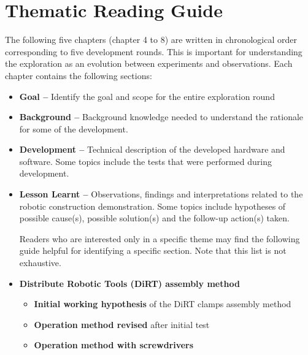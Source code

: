 \section{Thematic Reading Guide}
\label{section:methodology-thematic-reading-guide}

The following five chapters (chapter 4 to 8) are written in chronological order corresponding to five development rounds. This is important for understanding the exploration as an evolution between experiments and observations.  Each chapter contains the following sections:

\begin{itemize}
	\item \textbf{Goal --} Identify the goal and scope for the entire exploration round

	\item \textbf{Background --} Background knowledge needed to understand the rationale for some of the development.

	\item \textbf{Development --} Technical description of the developed hardware and software. Some topics include the tests that were performed during development.

	\item \textbf{Lesson Learnt --} Observations, findings and interpretations related to the robotic construction demonstration. Some topics include hypotheses of possible cause(s), possible solution(s) and the follow-up action(s) taken. 

Readers who are interested only in a specific theme may find the following guide helpful for identifying a specific section. Note that this list is not exhaustive. 

	\item \textbf{Distribute Robotic Tools (DiRT) assembly method}

\begin{itemize}
	\item \textbf{Initial working hypothesis} of the DiRT clamps assembly method 

	\item \textbf{Operation method revised} after initial test 

	\item \textbf{Operation method with screwdrivers} 


\end{itemize}
\end{itemize}
